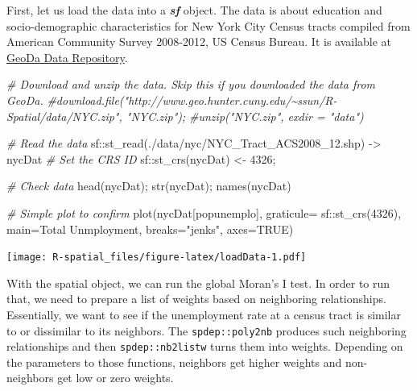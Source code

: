 \documentclass[
  11pt,
]{book}
\newenvironment{Shaded}{\begin{snugshade}}{\end{snugshade}}
\newcommand{\AttributeTok}[1]{\textcolor[rgb]{0.77,0.63,0.00}{#1}}
\newcommand{\CommentTok}[1]{\textcolor[rgb]{0.56,0.35,0.01}{\textit{#1}}}
\newcommand{\ConstantTok}[1]{\textcolor[rgb]{0.00,0.00,0.00}{#1}}
\newcommand{\DecValTok}[1]{\textcolor[rgb]{0.00,0.00,0.81}{#1}}
\newcommand{\FunctionTok}[1]{\textcolor[rgb]{0.00,0.00,0.00}{#1}}
\newcommand{\NormalTok}[1]{#1}
\newcommand{\OtherTok}[1]{\textcolor[rgb]{0.56,0.35,0.01}{#1}}
\newcommand{\SpecialCharTok}[1]{\textcolor[rgb]{0.00,0.00,0.00}{#1}}
\newcommand{\StringTok}[1]{\textcolor[rgb]{0.31,0.60,0.02}{#1}}
\begin{document}
First, let us load the data into a \textbf{\emph{sf}} object. The data is about education and socio-demographic characteristics for New York City Census tracts compiled from American Community Survey 2008-2012, US Census Bureau. It is available at \href{https://geodacenter.github.io/data-and-lab//NYC_Tract_ACS2008_12/}{GeoDa Data Repository}.

\begin{Shaded}
\begin{Highlighting}[]
\CommentTok{\# Download and unzip the data. Skip this if you downloaded the data from GeoDa.}
\CommentTok{\#download.file("http://www.geo.hunter.cuny.edu/\textasciitilde{}ssun/R{-}Spatial/data/NYC.zip", "NYC.zip");}
\CommentTok{\#unzip("NYC.zip", exdir = "data")}

\CommentTok{\# Read the data}
\NormalTok{sf}\SpecialCharTok{::}\FunctionTok{st\_read}\NormalTok{(}\StringTok{\textquotesingle{}./data/nyc/NYC\_Tract\_ACS2008\_12.shp\textquotesingle{}}\NormalTok{) }\OtherTok{{-}\textgreater{}}\NormalTok{ nycDat}
\CommentTok{\# Set the CRS ID}
\NormalTok{sf}\SpecialCharTok{::}\FunctionTok{st\_crs}\NormalTok{(nycDat) }\OtherTok{\textless{}{-}} \DecValTok{4326}\NormalTok{;}

\CommentTok{\# Check data}
\FunctionTok{head}\NormalTok{(nycDat); }
\FunctionTok{str}\NormalTok{(nycDat);}
\FunctionTok{names}\NormalTok{(nycDat)}

\CommentTok{\# Simple plot to confirm}
\FunctionTok{plot}\NormalTok{(nycDat[}\StringTok{\textquotesingle{}popunemplo\textquotesingle{}}\NormalTok{], }\AttributeTok{graticule=}\NormalTok{ sf}\SpecialCharTok{::}\FunctionTok{st\_crs}\NormalTok{(}\DecValTok{4326}\NormalTok{), }
     \AttributeTok{main=}\StringTok{\textquotesingle{}Total Unmployment\textquotesingle{}}\NormalTok{, }\AttributeTok{breaks=}\StringTok{"jenks"}\NormalTok{, }\AttributeTok{axes=}\ConstantTok{TRUE}\NormalTok{)}
\end{Highlighting}
\end{Shaded}

\texttt{[image: R-spatial\_files/figure-latex/loadData-1.pdf]}

With the spatial object, we can run the global Moran's I test. In order to run that, we need to prepare a list of weights based on neighboring relationships. Essentially, we want to see if the unemployment rate at a census tract is similar to or dissimilar to its neighbors. The \texttt{spdep::poly2nb} produces such neighboring relationships and then \texttt{spdep::nb2listw} turns them into weights. Depending on the parameters to those functions, neighbors get higher weights and non-neighbors get low or zero weights.
\end{document}
